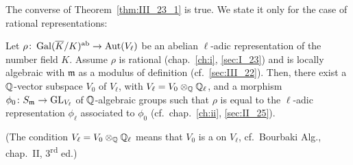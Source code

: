 The converse of Theorem~\ref{thm:III_23_1} is true. We state it only for the
case of rational representations:
\begin{thm}
	Let $\rho\colon \operatorname{Gal}(\overline{K}/K)^{\mathrm{ab}} \to \operatorname{Aut}(V_\ell)$ be an abelian
	$\ell$-adic representation of the number field $K$. Assume $\rho$ is
	rational (chap.~\ref{ch:i}, \ref{sec:I_23}) and is locally algebraic
	with $\mathfrak{m}$ as a modulus of definition (cf.\ \ref{sec:III_22}).
	Then, there exist a $\mathbb{Q}$-vector subspace $V_0$ of $V_\ell$, with
	$V_\ell = V_0 \otimes_{\mathbb{Q}} \mathbb{Q}_\ell$, and a morphism $\phi_0 \colon
	S_{\mathfrak{m}} \to \operatorname{GL}_{V_\ell}$ of $\mathbb{Q}$-algebraic groups such that
	$\rho$ is equal to the $\ell$-adic representation $\phi_\ell$
	associated to $\phi_0$ (cf.\ chap.~\ref{ch:ii}, \ref{sec:II_25}).
\end{thm}
(The condition $V_\ell = V_0 \otimes_{\mathbb{Q}} \mathbb{Q}_\ell$ means that $V_0$ is a
 on $V_\ell$, cf.\ Bourbaki Alg., chap.~II,
3\textsuperscript{rd} ed.)

